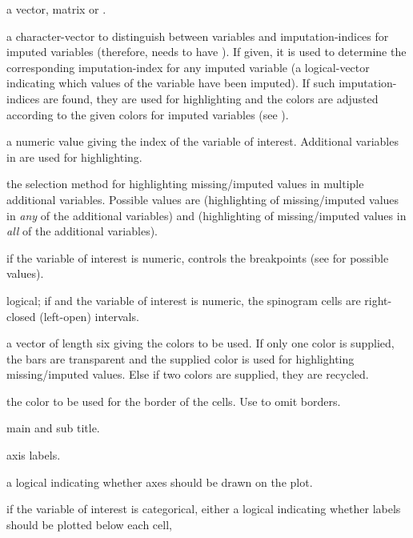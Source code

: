 \begin{Arguments}
\begin{ldescription}
\item[\code{x}] a vector, matrix or .
\item[\code{delimiter}] a character-vector to distinguish between variables
and imputation-indices for imputed variables (therefore,  needs
to have ). If given, it is used to determine the corresponding
imputation-index for any imputed variable (a logical-vector indicating
which values of the variable have been imputed). If such imputation-indices
are found, they are used for highlighting and the colors are adjusted 
according to the given colors for imputed variables (see ).
\item[\code{pos}] a numeric value giving the index of the variable of 
interest.  Additional variables in  are used for 
highlighting.
\item[\code{selection}] the selection method for highlighting missing/imputed values 
in multiple additional variables.  Possible values are  
(highlighting of missing/imputed values in \emph{any} of the additional 
variables) and  (highlighting of missing/imputed values in 
\emph{all} of the additional variables).
\item[\code{breaks}] if the variable of interest is numeric,  
controls the breakpoints (see  for 
possible values).
\item[\code{right}] logical; if  and the variable of interest is 
numeric, the spinogram cells are right-closed (left-open) intervals.
\item[\code{col}] a vector of length six giving the colors to be used. If 
only one color is supplied, the bars are transparent and the 
supplied color is used for highlighting missing/imputed values.
Else if two colors are supplied, they are recycled.
\item[\code{border}] the color to be used for the border of the cells. 
Use  to omit borders.
\item[\code{main, sub}] main and sub title.
\item[\code{xlab, ylab}] axis labels.
\item[\code{axes}] a logical indicating whether axes should be drawn 
on the plot.
\item[\code{labels}] if the variable of interest is categorical, either a 
logical indicating whether labels should be plotted below each cell, 

\end{ldescription}
\end{Arguments}
